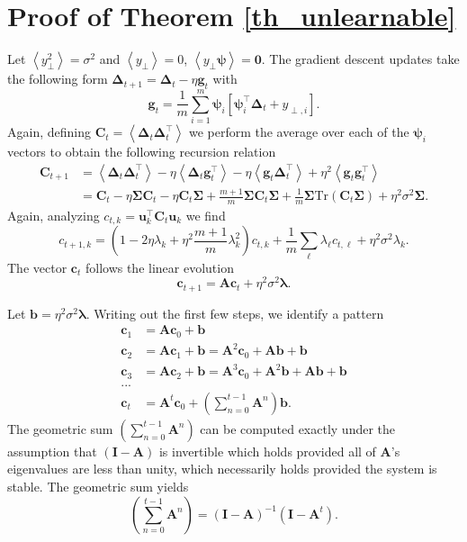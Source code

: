 \documentclass{article} %
\def\bSigma{\mathbf \Sigma}
\def\A{\mathbf A}
\def\u{\mathbf u}
\def\I{\mathbf I}
\def\C{\mathbf C}
\def\g{\mathbf g}
\begin{document}
\section{Proof of Theorem \ref{th_unlearnable}}\label{app_proof_unlearnable}

Let $\left< y_\perp^2 \right> = \sigma^2$ and $\left< y_\perp \right> = 0$, $\left< y_{\perp} \bm\psi \right> = \bm 0$. The gradient descent updates take the following form $\bm\Delta_{t+1} = \bm\Delta_t - \eta \g_t$ with
\begin{equation}
    \g_t = \frac{1}{m} \sum_{i=1}^m \bm\psi_i \left[ \bm\psi_i^\top \bm\Delta_t + y_{\perp,i} \right].
\end{equation}
%
Again, defining $\C_t = \left< \bm\Delta_t \bm\Delta_t^\top \right>$ we perform the average over each of the $\bm\psi_i$ vectors to obtain the following recursion relation
\begin{align}
    \C_{t+1} &= \left< \bm\Delta_t \bm\Delta_t^\top \right> - \eta \left< \bm\Delta_t \g_t^\top \right> -\eta \left<  \g_t  \bm\Delta_t^\top \right> + \eta^2 \left< \g_t \g_t^\top \right> \nonumber
    \\
    &=\C_t - \eta \bm\Sigma \C_t - \eta \C_t \bm\Sigma + \frac{m+1}{m} \bm\Sigma \C_t \bSigma + \frac{1}{m} \bSigma \text{Tr}\left( \C_t \bSigma \right) + \eta^2 \sigma^2 \bSigma.
\end{align}
%
Again, analyzing $c_{t,k} = \u_k^\top \C_t \u_k$ we find
\begin{equation}
    c_{t+1,k} = \left(1-2\eta\lambda_k + \eta^2 \frac{m+1}{m} \lambda_k^2 \right) c_{t,k} + \frac{1}{m} \sum_\ell \lambda_{\ell} c_{t,\ell} + \eta^2 \sigma^2 \lambda_k.
\end{equation}
%
The vector $\bm c_t$ follows the linear evolution
\begin{equation}
    \bm c_{t+1} = \A \bm c_t + \eta^2 \sigma^2 \bm\lambda.
\end{equation}

Let $\bm b = \eta^2 \sigma^2 \bm\lambda$. Writing out the first few steps, we identify a pattern
\begin{align}
    \bm c_{1} &= \A \bm c_0 + \bm b \nonumber
    \\
    \bm c_{2} &= \A \bm c_1 + \bm b = \A^2 \bm c_0 + \A \bm b + \bm b \nonumber
    \\
    \bm c_{3} &= \A \bm c_2 + \bm b = \A^3 \bm c_0 + \A^2 \bm b + \A \bm b + \bm b \nonumber
    \\
    ... \nonumber
    \\
    \bm c_{t} &= \A^t \bm c_0 + \left( \sum_{n=0}^{t-1} \A^n \right) \bm b. 
\end{align}
%
The geometric sum $\left( \sum_{n=0}^{t-1} \A^n \right)$ can be computed exactly under the assumption that $(\I - \A)$ is invertible which holds provided all of $\A$'s eigenvalues are less than unity, which necessarily holds provided the system is stable. The geometric sum yields
\begin{equation}
    \left( \sum_{n=0}^{t-1} \A^n \right) = (\I - \A)^{-1} \left( \I - \A^t \right).
\end{equation}
\end{document}
